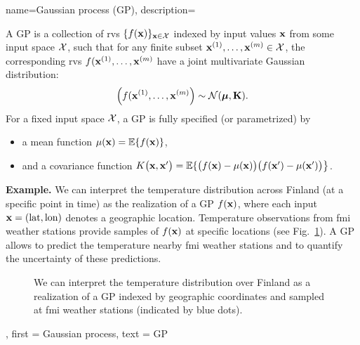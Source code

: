 {name={Gaussian process (GP)},
	description={A GP is a collection of \gls{rv}s 
		$\{f({\bf x})\}_{{\bf x} \in \mathcal{X}}$ indexed by input values ${\bf x}$ 
		from some input space $\mathcal{X}$, such that for any finite subset 
		${\bf x}^{(1)}, \ldots, {\bf x}^{(m)} \in \mathcal{X}$, 
		the corresponding \gls{rv}s $f({\bf x}^{(1)}, \ldots, {\bf x}^{(m)}$ have a joint 
		multivariate Gaussian distribution:
		\[
		\left( f({\bf x}^{(1)}, \ldots, {\bf x}^{(m)} \right) \sim \mathcal{N}(\boldsymbol{\mu}, \mathbf{K}).
		\]
		For a fixed input space $\mathcal{X}$, a GP is fully specified (or parametrized) by 
		\begin{itemize}
			\item a \gls{mean} function $\mu({\bf x}) = \mathbb{E}\{ f({\bf x})\}$,
			\item and a covariance function $K\big({\bf x},{\bf x}'\big)= \mathbb{E}\{ \big(f({\bf x})-\mu({\bf x})\big) \big(f({\bf x}')-\mu({\bf x}')\big) \big\}$.
		\end{itemize}
		\textbf{Example.} We can interpret the temperature distribution across Finland (at a specific 
		point in time) as the \gls{realization} of a GP $f({\bf x})$, where each input ${\bf x} = (\text{lat}, \text{lon})$ 
		denotes a geographic location. Temperature observations from \gls{fmi} weather stations provide 
		samples of $f({\bf x})$ at specific locations (see Fig.\ \ref{fig_gp_FMI}). A GP allows to 
		predict the temperature nearby \gls{fmi} weather stations and to quantify the uncertainty 
		of these predictions. 
		\begin{figure}[H]
			\begin{center}
				\vspace*{-15mm}
			\end{center}
			\caption{We can interpret the temperature distribution over Finland as a \gls{realization} 
				of a GP indexed by geographic coordinates and sampled at \gls{fmi} weather stations (indicated by 
				blue dots). \label{fig_gp_FMI}}
	\end{figure}}, 
	first = {Gaussian process}, 
	text = {GP}
}

